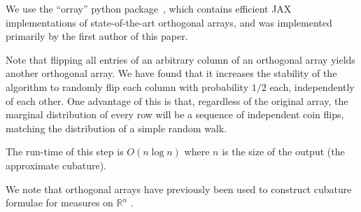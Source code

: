 \documentclass[11pt, letterpaper]{article}
\theoremstyle{definition}
\theoremstyle{remark}
\newcommand{\R}{\mathbb{R}}
\begin{document}
We use the ``orray'' python package~\cite{orray}, which contains efficient JAX~\cite{jax2018github} implementations of state-of-the-art orthogonal arrays, and was implemented primarily by the first author of this paper.

Note that flipping all entries of an arbitrary column of an orthogonal array yields another orthogonal array. We have found that it increases the stability of the algorithm to randomly flip each column with probability $1/2$ each, independently of each other. One advantage of this is that, regardless of the original array, the marginal distribution of every row will be a sequence of independent coin flips, matching the distribution of a simple random walk.

The run-time of this step is $O(n \log n)$ where $n$ is the size of the output (the approximate cubature).

We note that orthogonal arrays have previously been used to construct cubature formulae for measures on $\R^n$ \cite{victoirOA}.
\end{document}
